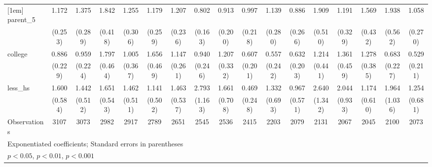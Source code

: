 {\begin{tabular}{l*{16}{c}}
[1em]
parent\_5            &       1.172         &       1.375         &       1.842\sym{**} &       1.255         &       1.179         &       1.207         &       0.802         &       0.913         &       0.997         &       1.139         &       0.886         &       1.909\sym{*}  &       1.191         &       1.569         &       1.938\sym{*}  &       1.058         \\
                    &     (0.253)         &     (0.289)         &     (0.418)         &     (0.306)         &     (0.259)         &     (0.236)         &     (0.163)         &     (0.200)         &     (0.218)         &     (0.280)         &     (0.266)         &     (0.510)         &     (0.329)         &     (0.432)         &     (0.562)         &     (0.270)         \\
[1em]
college             &       0.886         &       0.959         &       1.797\sym{*}  &       1.005         &       1.656         &       1.147         &       0.940         &       1.207         &       0.607         &       0.557         &       0.632         &       1.214         &       1.361         &       1.278         &       0.683         &       0.529         \\
                    &     (0.229)         &     (0.224)         &     (0.464)         &     (0.367)         &     (0.469)         &     (0.261)         &     (0.246)         &     (0.332)         &     (0.201)         &     (0.242)         &     (0.203)         &     (0.441)         &     (0.459)         &     (0.385)         &     (0.227)         &     (0.211)         \\
[1em]
less\_hs             &       1.600         &       1.442         &       1.651         &       1.462         &       1.141         &       1.463         &       2.793\sym{*}  &       1.661         &       0.469         &       1.332         &       0.967         &       2.640         &       2.044         &       1.174         &       1.964         &       1.254         \\
                    &     (0.584)         &     (0.512)         &     (0.543)         &     (0.511)         &     (0.502)         &     (0.537)         &     (1.163)         &     (0.708)         &     (0.248)         &     (0.693)         &     (0.571)         &     (1.342)         &     (0.933)         &     (0.610)         &     (1.036)         &     (0.681)         \\
\hline
Observations        &        3107         &        3073         &        2982         &        2917         &        2789         &        2651         &        2545         &        2536         &        2415         &        2203         &        2079         &        2131         &        2067         &        2045         &        2100         &        2073         \\
\hline\hline
\multicolumn{17}{l}{\footnotesize Exponentiated coefficients; Standard errors in parentheses}\\
\multicolumn{17}{l}{\footnotesize \sym{*} \(p<0.05\), \sym{**} \(p<0.01\), \sym{***} \(p<0.001\)}\\
\end{tabular}
}
